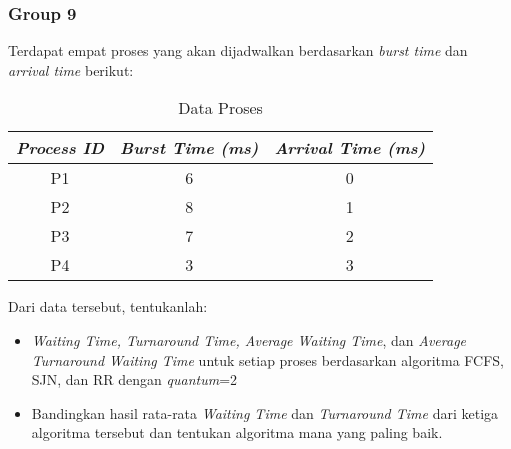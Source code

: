 \documentclass[12pt]{article}
\begin{document}
\subsubsection{Group 9}
Terdapat empat proses yang akan dijadwalkan berdasarkan \textit{burst time} dan \textit{arrival time} berikut:

\begin{table}[H]
\centering
\begin{tabular}{|c|c|c|}
\hline
\textbf{\textit{Process ID}} & \textbf{\textit{Burst Time (ms)}} & \textbf{\textit{Arrival Time (ms)}} \\
\hline
P1 & 6 & 0 \\
\hline
P2 & 8 & 1 \\
\hline
P3 & 7 & 2 \\
\hline
P4 & 3 & 3 \\
\hline
\end{tabular}
\caption{Data Proses}
\end{table}

Dari data tersebut, tentukanlah:
\begin{itemize}
     \item \textit{Waiting Time, Turnaround Time, Average Waiting Time}, dan \textit{Average Turnaround Waiting Time} untuk setiap proses berdasarkan algoritma FCFS, SJN, dan RR dengan \textit{quantum}=2
    \item Bandingkan hasil rata-rata \textit{Waiting Time} dan \textit{Turnaround Time} dari ketiga algoritma tersebut dan tentukan algoritma mana yang paling baik.
\end{itemize}
\end{document}
